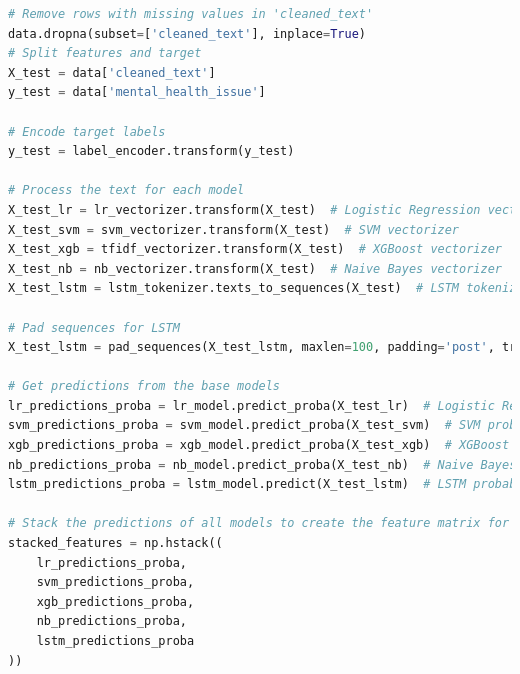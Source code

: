 \begin{tcolorbox}[colback=gray!5!white, colframe=gray!80!black, boxrule=0.5pt, title=Evaluate Meta-Learner and Ensemble Model]
    \begin{lstlisting}[language=Python]
# Remove rows with missing values in 'cleaned_text'
data.dropna(subset=['cleaned_text'], inplace=True)
# Split features and target
X_test = data['cleaned_text']
y_test = data['mental_health_issue']

# Encode target labels
y_test = label_encoder.transform(y_test)

# Process the text for each model
X_test_lr = lr_vectorizer.transform(X_test)  # Logistic Regression vectorizer
X_test_svm = svm_vectorizer.transform(X_test)  # SVM vectorizer
X_test_xgb = tfidf_vectorizer.transform(X_test)  # XGBoost vectorizer
X_test_nb = nb_vectorizer.transform(X_test)  # Naive Bayes vectorizer
X_test_lstm = lstm_tokenizer.texts_to_sequences(X_test)  # LSTM tokenizer

# Pad sequences for LSTM
X_test_lstm = pad_sequences(X_test_lstm, maxlen=100, padding='post', truncating='post')

# Get predictions from the base models
lr_predictions_proba = lr_model.predict_proba(X_test_lr)  # Logistic Regression probabilities
svm_predictions_proba = svm_model.predict_proba(X_test_svm)  # SVM probabilities
xgb_predictions_proba = xgb_model.predict_proba(X_test_xgb)  # XGBoost probabilities
nb_predictions_proba = nb_model.predict_proba(X_test_nb)  # Naive Bayes probabilities
lstm_predictions_proba = lstm_model.predict(X_test_lstm)  # LSTM probabilities

# Stack the predictions of all models to create the feature matrix for the meta-learner
stacked_features = np.hstack((
    lr_predictions_proba,
    svm_predictions_proba,
    xgb_predictions_proba,
    nb_predictions_proba,
    lstm_predictions_proba
))

\end{lstlisting}
\end{tcolorbox}


